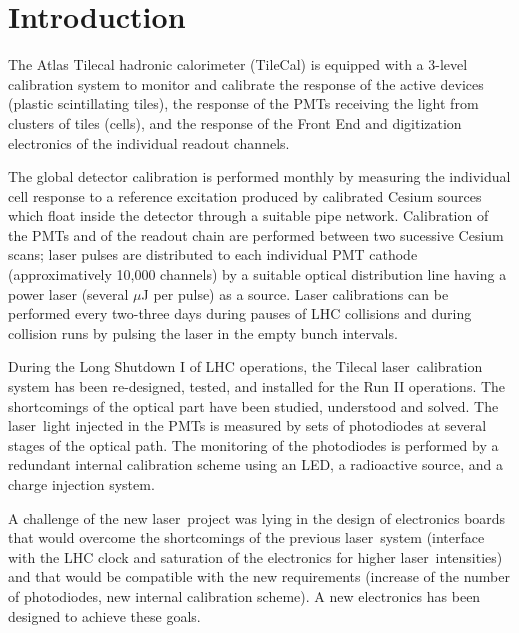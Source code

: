 \documentclass[UKenglish,texlive=2013]{\ATLASLATEXPATH atlasdoc}
\newcommand{\laser}{laser}
\begin{document}
\maketitle

\tableofcontents


\section{Introduction}
\label{sec:intro}

The Atlas Tilecal hadronic calorimeter (TileCal) \cite{ref:tilecal} is equipped with a 3-level calibration system to monitor and  calibrate the response of the active devices (plastic scintillating tiles), the response of the PMTs receiving the light from clusters of tiles (cells), and the response of the Front End and digitization electronics of the individual readout channels. \par
The global detector calibration is performed monthly by measuring the individual cell response to a reference excitation produced by calibrated Cesium sources which float inside the detector through a suitable pipe network.
Calibration of the PMTs and of the readout chain are performed between two sucessive Cesium scans; laser pulses are distributed to each individual PMT cathode (approximatively 10,000 channels) by a suitable optical distribution line having a power laser (several $\mu$J per pulse) as a source. Laser calibrations can be performed every two-three days during pauses of LHC collisions and during collision runs by pulsing the laser in the empty bunch intervals.  \par
During the Long Shutdown I of LHC operations, the Tilecal \laser~calibration system has been re-designed, tested, and installed for the Run II operations. The shortcomings of the optical part have been studied, understood and solved. The \laser~light injected in the PMTs is measured by sets of photodiodes at several stages of the optical path. The monitoring of the photodiodes is performed by a redundant internal calibration scheme using an LED, a radioactive source, and a charge injection system. \par
A challenge of the new \laser~project was lying in the design of electronics boards that would overcome the shortcomings of the previous \laser~system (interface with the LHC clock and saturation of the electronics for higher \laser~intensities) and that would be compatible with the new requirements (increase of the number of photodiodes, new internal calibration scheme). A new electronics has been designed to achieve these goals.\par
\end{document}

